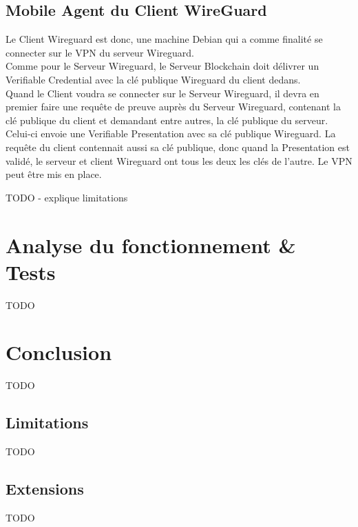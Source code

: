 \documentclass[12pt, openany]{report}
\begin{document}
\subsection{Mobile Agent du Client WireGuard}
\noindent 
\begin{flushleft}
Le Client Wireguard est donc, une machine Debian qui a comme finalité se connecter sur le VPN du serveur Wireguard. \\
Comme pour le Serveur Wireguard, le Serveur Blockchain doit délivrer un Verifiable Credential avec la clé publique Wireguard du client dedans. \\
Quand le Client voudra se connecter sur le Serveur Wireguard, il devra en premier faire une requête de preuve auprès du Serveur Wireguard, contenant la clé publique du client et demandant entre autres, la clé publique du serveur. Celui-ci envoie une Verifiable Presentation avec sa clé publique Wireguard. La requête du client contennait aussi sa clé publique, donc quand la Presentation est validé, le serveur et client Wireguard ont tous les deux les clés de l'autre. Le VPN peut être mis en place. 

TODO - explique limitations
\end{flushleft}




\section{Analyse du fonctionnement \& Tests}
\noindent 
\begin{flushleft}
TODO
\end{flushleft}

\section{Conclusion}
\noindent 
\begin{flushleft}
TODO
\end{flushleft}
\subsection{Limitations}
\noindent 
\begin{flushleft}
TODO
\end{flushleft}
\subsection{Extensions}
\noindent 
\begin{flushleft}
TODO
\end{flushleft}
\end{document}

